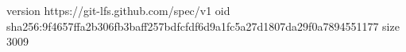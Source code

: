 version https://git-lfs.github.com/spec/v1
oid sha256:9f4657ffa2b306fb3baff257bdfcfdf6d9a1fc5a27d1807da29f0a7894551177
size 3009
